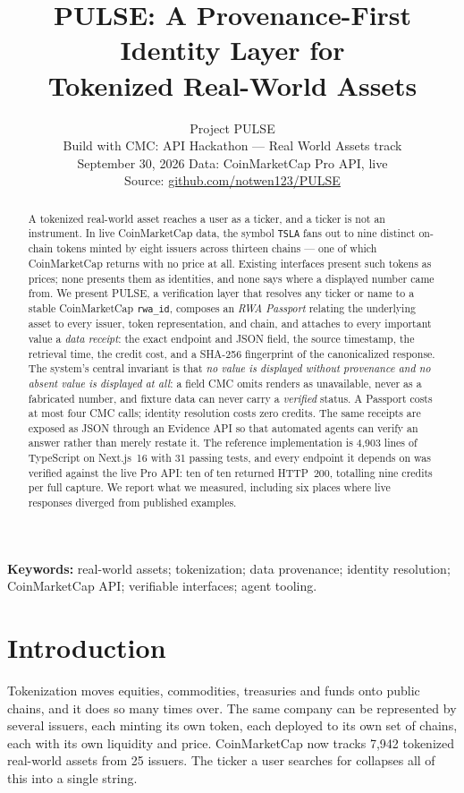 \documentclass[11pt]{article}
\title{\textbf{PULSE: A Provenance-First Identity Layer for\\Tokenized Real-World Assets}}
\author{Project PULSE\\[2pt]
\small Build with CMC: API Hackathon --- Real World Assets track\\
\small September 30, 2026 \textperiodcentered{} Data: CoinMarketCap Pro API, live\\
\small Source: \url{github.com/notwen123/PULSE}}
\date{}
\newcommand{\code}[1]{\texttt{\small #1}}
\begin{document}
\maketitle

\begin{abstract}
\noindent A tokenized real-world asset reaches a user as a ticker, and a ticker is not an instrument. In live CoinMarketCap data, the symbol \code{TSLA} fans out to nine distinct on-chain tokens minted by eight issuers across thirteen chains --- one of which CoinMarketCap returns with no price at all. Existing interfaces present such tokens as prices; none presents them as identities, and none says where a displayed number came from. We present \textsc{PULSE}, a verification layer that resolves any ticker or name to a stable CoinMarketCap \code{rwa\_id}, composes an \emph{RWA Passport} relating the underlying asset to every issuer, token representation, and chain, and attaches to every important value a \emph{data receipt}: the exact endpoint and JSON field, the source timestamp, the retrieval time, the credit cost, and a SHA-256 fingerprint of the canonicalized response. The system's central invariant is that \emph{no value is displayed without provenance and no absent value is displayed at all}: a field CMC omits renders as unavailable, never as a fabricated number, and fixture data can never carry a \emph{verified} status. A Passport costs at most four CMC calls; identity resolution costs zero credits. The same receipts are exposed as JSON through an Evidence API so that automated agents can verify an answer rather than merely restate it. The reference implementation is 4,903 lines of TypeScript on Next.js~16 with 31 passing tests, and every endpoint it depends on was verified against the live Pro API: ten of ten returned HTTP~200, totalling nine credits per full capture. We report what we measured, including six places where live responses diverged from published examples.
\end{abstract}

\noindent\textbf{Keywords:} real-world assets; tokenization; data provenance; identity resolution; CoinMarketCap API; verifiable interfaces; agent tooling.

\section{Introduction}

Tokenization moves equities, commodities, treasuries and funds onto public chains, and it does so many times over. The same company can be represented by several issuers, each minting its own token, each deployed to its own set of chains, each with its own liquidity and price. CoinMarketCap now tracks 7,942 tokenized real-world assets from 25 issuers. The ticker a user searches for collapses all of this into a single string.
\end{document}
